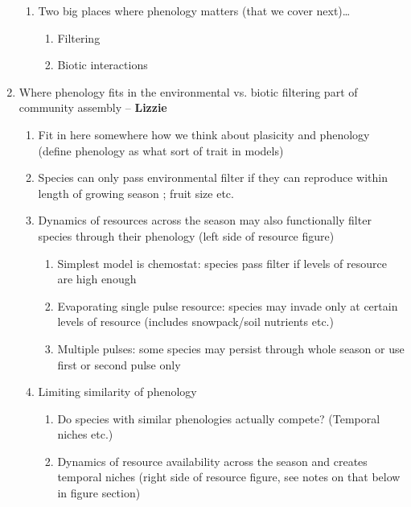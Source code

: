 \documentclass[11pt]{article}
\begin{document}
\begin{enumerate}
\begin{enumerate}
\item Two big places where phenology matters (that we cover next)…
\begin{enumerate}
\item Filtering
\item Biotic interactions
\end{enumerate}
\end{enumerate}
\item Where phenology fits in the environmental vs. biotic filtering part of community assembly -- {\bf Lizzie} %
\begin{enumerate}
\begin{enumerate}
\item Fit in here somewhere how we think about plasicity and phenology (define phenology as what sort of trait in models)
\item Species can only pass environmental filter if they can reproduce within length of growing season \citep[PhenoFit model predicts species range limits, see][]{Chuine:2001ab}; fruit size etc.
\item Dynamics of resources across the season may also functionally filter species through their phenology (left side of resource figure)
\begin{enumerate}
\item Simplest model is chemostat: species pass filter if levels of resource are high enough
\item Evaporating single pulse resource: species may invade only at certain levels of resource (includes snowpack/soil nutrients etc.)
\item Multiple pulses: some species may persist through whole season or use first or second pulse only
\end{enumerate}
\item Limiting similarity of phenology %
\begin{enumerate}
\item Do species with similar phenologies actually compete? (Temporal niches etc.)
\item Dynamics of resource availability across the season and creates temporal niches (right side of resource figure, see notes on that below in figure section) %
\end{enumerate}
\end{enumerate}

\end{enumerate}
\end{enumerate}
\end{document}
